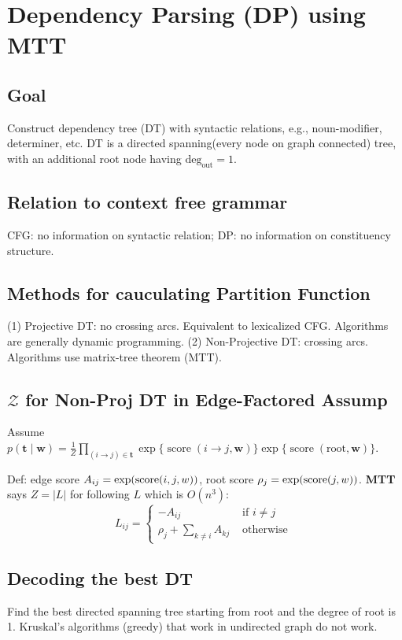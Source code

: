 \section{Dependency Parsing (DP) using MTT}

\subsection*{Goal} Construct dependency tree (DT) with syntactic relations, e.g., noun-modifier, determiner, etc. DT is a directed spanning(every node on graph connected) tree, with an additional root node having $\mathrm{deg}_{\mathrm{out}}=1$.

\subsection*{Relation to context free grammar}
CFG: no information on syntactic relation; DP: no information on constituency structure. 

\subsection*{Methods for cauculating Partition Function} 
(1) Projective DT: no crossing arcs. Equivalent to lexicalized CFG. Algorithms are generally dynamic programming. 
(2) Non-Projective DT: crossing arcs. Algorithms use matrix-tree theorem (MTT).


\subsection*{$\mathcal{Z}$ for Non-Proj DT in Edge-Factored Assump}
Assume $p(\mathbf{t} \mid \mathbf{w})=\frac{1}{Z} \prod_{(i \rightarrow j) \in \mathbf{t}} \exp \{\operatorname{score}(i\to j, \mathbf{w})\} \exp \{\operatorname{score}(\mathrm{root}, \mathbf{w})\}$.

Def: edge score $A_{ij}=\exp(\text{score}(i,j,w))$, root score $\rho_j = \exp(\text{score}(j,w))$. \textbf{MTT} says $Z=|L|$ for following $L$ which is $O(n^3)$:
\vspace{-0.3cm}
$$L_{i j}= \begin{cases}-A_{i j} & \text { if } i \neq j \\ \rho_{j}+\sum_{k \neq i} A_{k j} & \text { otherwise }\end{cases}$$
\vspace{-0.3cm}

\subsection*{Decoding the best DT}
Find the best directed spanning tree starting from root and the degree of root is 1. \; Kruskal's algorithms (greedy) that work in undirected graph do not work.

